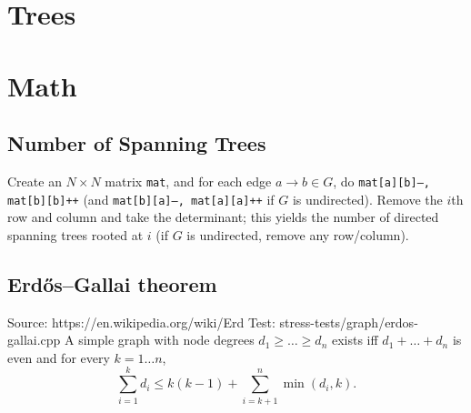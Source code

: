 
\section{Trees}

\section{Math}
	\subsection{Number of Spanning Trees}
		Create an $N\times N$ matrix \texttt{mat}, and for each edge $a \rightarrow b \in G$, do
		\texttt{mat[a][b]--, mat[b][b]++} (and \texttt{mat[b][a]--, mat[a][a]++} if $G$ is undirected).
		Remove the $i$th row and column and take the determinant; this yields the number of directed spanning trees rooted at $i$
		(if $G$ is undirected, remove any row/column).
		$$$$

	\subsection{Erdős–Gallai theorem}
		Source: https://en.wikipedia.org/wiki/Erd%
		Test: stress-tests/graph/erdos-gallai.cpp
		A simple graph with node degrees $d_1 \ge \dots \ge d_n$ exists iff $d_1 + \dots + d_n$ is even and for every $k = 1\dots n$,
		\[ \sum _{i=1}^{k}d_{i}\leq k(k-1)+\sum _{i=k+1}^{n}\min(d_{i},k). \]
